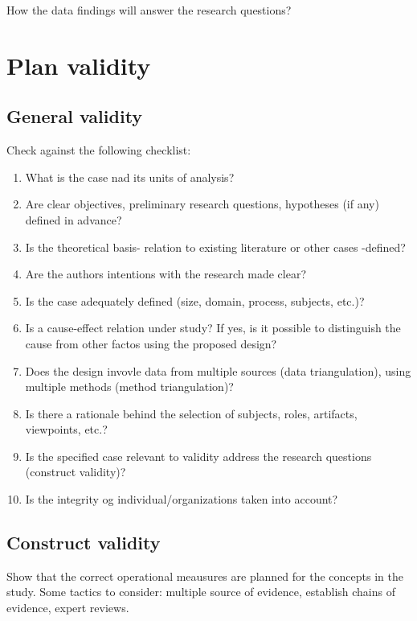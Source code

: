 How the data findings will answer the research questions?

\section{Plan validity}
\label{sec:planvalidity}

\subsection{General validity}
\label{subsec:general}
Check against the following checklist:

\begin{tcolorbox}[colback=black!5!white,colframe=black!75!white,title=Checklist for Case Design from \cite{runeson2009guidelines}]
    \begin{enumerate}
      \item What is the case nad its units of analysis?
      \item Are clear objectives, preliminary research questions, hypotheses (if any) defined in advance?
      \item Is the theoretical basis- relation to existing literature or other cases -defined?
      \item Are the authors intentions with the research made clear?
      \item Is the case adequately defined (size, domain, process, subjects, etc.)?
      \item Is a cause-effect relation under study? If yes, is it possible to distinguish the cause from other factos using the proposed design?
      \item Does the design invovle data from multiple sources (data triangulation), using multiple methods (method triangulation)?
      \item Is there a rationale behind the selection of subjects, roles, artifacts, viewpoints, etc.?
      \item Is the specified case relevant to validity address the research questions (construct validity)?
      \item Is the integrity og individual/organizations taken into account?
    \end{enumerate}
  \end{tcolorbox}

\subsection{Construct validity}
\label{subsec:construct}
Show that the correct operational meausures are planned for the concepts in the study. Some tactics to consider: multiple source of evidence, establish chains of evidence, expert reviews. 

